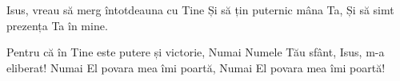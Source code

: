 \beginverse
Isus, vreau să merg întotdeauna cu Tine
Și să țin puternic mâna Ta,
Și să simt prezența Ta în mine.
\endverse

\beginchorus
Pentru că în Tine este putere și victorie,
Numai Numele Tău sfânt, Isus, m-a eliberat!
Numai El povara mea îmi poartă,
Numai El povara mea îmi poartă!
\endchorus
\endsong